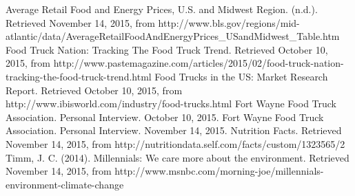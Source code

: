 \documentclass[12pt, letterpaper]{article}
\begin{document}
\begin{thebibliography}{9}


		Average Retail Food and Energy Prices, U.S. and Midwest Region. (n.d.). Retrieved November 14, 2015, from http://www.bls.gov/regions/mid-atlantic/data/AverageRetailFoodAndEnergyPrices\_USandMidwest\_Table.htm
		Food Truck Nation: Tracking The Food Truck Trend. Retrieved October 10, 2015, from http://www.pastemagazine.com/articles/2015/02/food-truck-nation-tracking-the-food-truck-trend.html
        Food Trucks in the US: Market Research Report. Retrieved October 10, 2015, from http://www.ibisworld.com/industry/food-trucks.html        
        Fort Wayne Food Truck Association. Personal Interview. October 10, 2015.
	    Fort Wayne Food Truck Association. Personal Interview. November 14, 2015.
	    Nutrition Facts. Retrieved November 14, 2015, from http://nutritiondata.self.com/facts/custom/1323565/2
		Timm, J. C. (2014). Millennials: We care more about the environment. Retrieved November 14, 2015, from http://www.msnbc.com/morning-joe/millennials-environment-climate-change

\end{thebibliography}

\newpage

\end{document}
